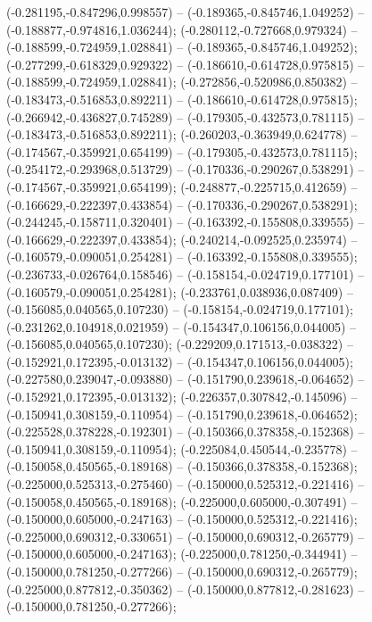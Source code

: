  (-0.281195,-0.847296,0.998557) -- (-0.189365,-0.845746,1.049252) -- (-0.188877,-0.974816,1.036244);
 (-0.280112,-0.727668,0.979324) -- (-0.188599,-0.724959,1.028841) -- (-0.189365,-0.845746,1.049252);
 (-0.277299,-0.618329,0.929322) -- (-0.186610,-0.614728,0.975815) -- (-0.188599,-0.724959,1.028841);
 (-0.272856,-0.520986,0.850382) -- (-0.183473,-0.516853,0.892211) -- (-0.186610,-0.614728,0.975815);
 (-0.266942,-0.436827,0.745289) -- (-0.179305,-0.432573,0.781115) -- (-0.183473,-0.516853,0.892211);
 (-0.260203,-0.363949,0.624778) -- (-0.174567,-0.359921,0.654199) -- (-0.179305,-0.432573,0.781115);
 (-0.254172,-0.293968,0.513729) -- (-0.170336,-0.290267,0.538291) -- (-0.174567,-0.359921,0.654199);
 (-0.248877,-0.225715,0.412659) -- (-0.166629,-0.222397,0.433854) -- (-0.170336,-0.290267,0.538291);
 (-0.244245,-0.158711,0.320401) -- (-0.163392,-0.155808,0.339555) -- (-0.166629,-0.222397,0.433854);
 (-0.240214,-0.092525,0.235974) -- (-0.160579,-0.090051,0.254281) -- (-0.163392,-0.155808,0.339555);
 (-0.236733,-0.026764,0.158546) -- (-0.158154,-0.024719,0.177101) -- (-0.160579,-0.090051,0.254281);
 (-0.233761,0.038936,0.087409) -- (-0.156085,0.040565,0.107230) -- (-0.158154,-0.024719,0.177101);
 (-0.231262,0.104918,0.021959) -- (-0.154347,0.106156,0.044005) -- (-0.156085,0.040565,0.107230);
 (-0.229209,0.171513,-0.038322) -- (-0.152921,0.172395,-0.013132) -- (-0.154347,0.106156,0.044005);
 (-0.227580,0.239047,-0.093880) -- (-0.151790,0.239618,-0.064652) -- (-0.152921,0.172395,-0.013132);
 (-0.226357,0.307842,-0.145096) -- (-0.150941,0.308159,-0.110954) -- (-0.151790,0.239618,-0.064652);
 (-0.225528,0.378228,-0.192301) -- (-0.150366,0.378358,-0.152368) -- (-0.150941,0.308159,-0.110954);
 (-0.225084,0.450544,-0.235778) -- (-0.150058,0.450565,-0.189168) -- (-0.150366,0.378358,-0.152368);
 (-0.225000,0.525313,-0.275460) -- (-0.150000,0.525312,-0.221416) -- (-0.150058,0.450565,-0.189168);
 (-0.225000,0.605000,-0.307491) -- (-0.150000,0.605000,-0.247163) -- (-0.150000,0.525312,-0.221416);
 (-0.225000,0.690312,-0.330651) -- (-0.150000,0.690312,-0.265779) -- (-0.150000,0.605000,-0.247163);
 (-0.225000,0.781250,-0.344941) -- (-0.150000,0.781250,-0.277266) -- (-0.150000,0.690312,-0.265779);
 (-0.225000,0.877812,-0.350362) -- (-0.150000,0.877812,-0.281623) -- (-0.150000,0.781250,-0.277266);
